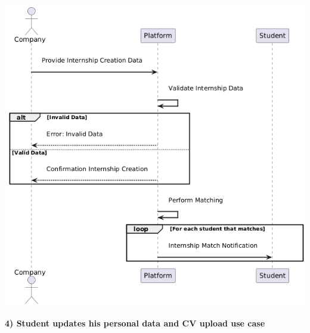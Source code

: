 \begin{center}
    \includegraphics[scale = 0.8]{Images/ImagesRASD/Internship_post_creation_use_case.png}
\end{center}

\newpage
\textbf{4) Student updates his personal data and CV upload use case}\\

